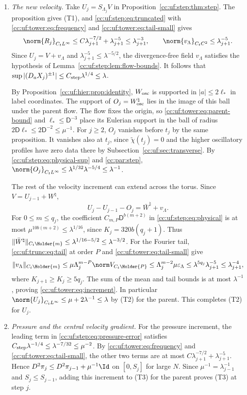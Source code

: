 \begin{enumerate}[leftmargin=*]
\item \emph{The new velocity.}
Take $U_j=S_{\Lambda_j}V$ in Proposition~\ref{cc:uf:step:thm:step}.
The proposition gives (T1), and \eqref{cc:uf:step:eq:truncated} with
\eqref{cc:uf:tower:eq:frequency} and \eqref{cc:uf:tower:eq:tail-small} gives
\[
 \norm{R_j}_{C_tL^\infty}\le C\lambda_{j+1}^{-7/2}+\lambda_{j+1}^{-5}
 \le\lambda_{j+1}^{-3},\qquad
 \norm{v_\Lambda}_{C_tC^2}\le\lambda_{j+1}^{-5}.
\]
Since $U_j=V+v_\Lambda$ and $\lambda_{j+1}^{-5}\le\lambda^{-5/2}$,
the divergence-free field $v_\Lambda$ satisfies the hypothesis of
Lemma~\ref{cc:uf:step:lem:flow-bounds}. It follows that
$\sup|(D_aX_j)^{\pm1}|\le C_{\rm step}\lambda^{1/4}\le\lambda$.

By Proposition~\ref{cc:uf:hier:prop:identity}, $W_{\rm osc}$ is supported
in $|a|\le2\ell_*$ in label coordinates. The support of
$O_j=W_{\rm osc}^\natural$ lies in the image of this ball under the
parent flow. The flow fixes the origin, so
\eqref{cc:uf:tower:eq:parent-bound} and $\ell_*\le\mathsf D^{-3}$
place its Eulerian support in the ball of radius
$2\mathsf D\ell_*\le2\mathsf D^{-2}\le\mu^{-1}$.
For $j\ge2$, $O_j$ vanishes before $t_j$ by the same proposition.
It vanishes also at $t_j$, since $\widetilde\chi(t_j)=0$ and the higher
oscillatory profiles have zero data there by Subsection~\ref{cc:uf:sec:transverse}.
By \eqref{cc:uf:step:eq:physical-sup} and \eqref{cc:par:step},
$\norm{O_j}_{C_tL^\infty}\le\lambda^{1/32}\lambda^{-5/4}\le\lambda^{-1}$.

The rest of the velocity increment can extend across the torus. Since
$V=U_{j-1}+W^\natural$,
\[
 U_j-U_{j-1}-O_j=\bar W^\natural+v_\Lambda .
\]
For $0\le m\le q_j$, the coefficient $C_{m,P}\mathsf D^{b(m+2)}$
in \eqref{cc:uf:step:eq:physical} is at most $\mu^{10b(m+2)}\le
\lambda^{1/16}$, since $K_j=320b(q_j+1)$. Thus
$\|\bar W^\natural\|_{C_t\Holder{m}}\le\lambda^{1/16-5/2}
\le\lambda^{-3/2}$. For the Fourier tail, \eqref{cc:uf:trunc:eq:tail}
at order $P$ and \eqref{cc:uf:tower:eq:tail-small} give
\[
 \|v_\Lambda\|_{C_t\Holder{m}}
 \le\mu\Lambda_j^{m-P}\norm V_{C_t\Holder{P}}
 \le\Lambda_j^{m-2}\mu\varepsilon_\Lambda
 \le\lambda^{5q_j}\lambda_{j+1}^{-5}\le\lambda_{j+1}^{-4},
\]
where $K_{j+1}\ge K_j\ge5q_j$. The sum of the mean and tail bounds is
at most $\lambda^{-1}$, proving \eqref{cc:uf:tower:eq:increment}.
In particular $\norm{U_j}_{C_tL^\infty}\le\mu+2\lambda^{-1}\le\lambda$
by (T2) for the parent. This completes (T2) for $U_j$.

\item \emph{Pressure and the central velocity gradient.}
For the pressure increment, the leading term in \eqref{cc:uf:step:eq:pressure-error}
satisfies $C_{\rm step}\lambda^{-1/4}\le\lambda^{-7/32}\le\mu^{-2}$.
By \eqref{cc:uf:tower:eq:frequency} and \eqref{cc:uf:tower:eq:tail-small},
the other two terms are at most $C\lambda_{j+1}^{-7/2}+\lambda_{j+1}^{-5}$.
Hence $D^2\pi_j\le D^2\pi_{j-1}+\mu^{-1}\Id$ on $[0,S_j]$ for large $N$.
Since $\mu^{-1}=\lambda_{j-1}^{-1}$ and $S_j\le S_{j-1}$, adding this
increment to (T3) for the parent proves (T3) at step $j$.


\end{enumerate}
